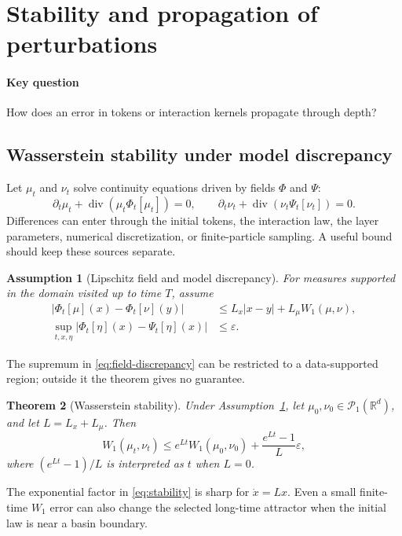 \documentclass[11pt]{amsart}
\numberwithin{equation}{section}
\theoremstyle{plain}
\newtheorem{theorem}{Theorem}[section]
\newtheorem{assumption}[theorem]{Assumption}
\newcommand{\R}{\mathbb{R}}
\newcommand{\cP}{\mathcal{P}}
\newcommand{\abs}[1]{\left\lvert#1\right\rvert}
\DeclareMathOperator{\diver}{div}
\begin{document}
\section{Stability and propagation of perturbations}\label{sec:stability}
\paragraph{\textbf{Key question}}
How does an error in tokens or interaction kernels propagate through depth?

\subsection{Wasserstein stability under model discrepancy}\label{sec:w1-stability}
Let $\mu_t$ and $\nu_t$ solve continuity equations driven by fields $\Phi$ and
$\Psi$:
\begin{equation}\label{eq:mu-nu}
 \partial_t\mu_t+\diver(\mu_t\Phi_t[\mu_t])=0,\qquad
 \partial_t\nu_t+\diver(\nu_t\Psi_t[\nu_t])=0.
\end{equation}
Differences can enter through the initial tokens, the interaction law, the
layer parameters, numerical discretization, or finite-particle sampling.  A
useful bound should keep these sources separate.

\begin{assumption}[Lipschitz field and model discrepancy]\label{ass:stability}
For measures supported in the domain visited up to time $T$, assume
\begin{align}
 \abs{\Phi_t[\mu](x)-\Phi_t[\nu](y)}
 &\leq L_x\abs{x-y}+L_\mu W_1(\mu,\nu),
 \label{eq:field-measure-lip}\\
 \sup_{t,x,\eta}
 \abs{\Phi_t[\eta](x)-\Psi_t[\eta](x)}
 &\leq\varepsilon.
 \label{eq:field-discrepancy}
\end{align}
\end{assumption}
The supremum in \eqref{eq:field-discrepancy} can be restricted to a
data-supported region; outside it the theorem gives no guarantee.


\begin{theorem}[Wasserstein stability]\label{thm:w1-stability}
Under Assumption~\ref{ass:stability}, let
$\mu_0,\nu_0\in\cP_1(\R^d)$, and let $L=L_x+L_\mu$.  Then
\begin{equation}\label{eq:stability}
    W_1(\mu_t,\nu_t)
    \leq e^{Lt}W_1(\mu_0,\nu_0)
       +\frac{e^{Lt}-1}{L}\varepsilon,
\end{equation}
where $(e^{Lt}-1)/L$ is interpreted as $t$ when $L=0$.
\end{theorem}
The exponential factor in \eqref{eq:stability} is sharp for
$\dot x=Lx$.  Even a small finite-time $W_1$ error can also change the selected
long-time attractor when the initial law is near a basin boundary.  
\end{document}
